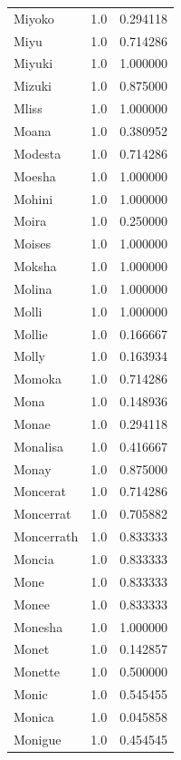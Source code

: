 \documentclass[
  letterpaper,
  DIV=11,
  numbers=noendperiod]{scrreprt}
\begin{document}
\begin{tabular}{lrr}
Miyoko          &   1.0 &   0.294118 \\
Miyu            &   1.0 &   0.714286 \\
Miyuki          &   1.0 &   1.000000 \\
Mizuki          &   1.0 &   0.875000 \\
Mliss           &   1.0 &   1.000000 \\
Moana           &   1.0 &   0.380952 \\
Modesta         &   1.0 &   0.714286 \\
Moesha          &   1.0 &   1.000000 \\
Mohini          &   1.0 &   1.000000 \\
Moira           &   1.0 &   0.250000 \\
Moises          &   1.0 &   1.000000 \\
Moksha          &   1.0 &   1.000000 \\
Molina          &   1.0 &   1.000000 \\
Molli           &   1.0 &   1.000000 \\
Mollie          &   1.0 &   0.166667 \\
Molly           &   1.0 &   0.163934 \\
Momoka          &   1.0 &   0.714286 \\
Mona            &   1.0 &   0.148936 \\
Monae           &   1.0 &   0.294118 \\
Monalisa        &   1.0 &   0.416667 \\
Monay           &   1.0 &   0.875000 \\
Moncerat        &   1.0 &   0.714286 \\
Moncerrat       &   1.0 &   0.705882 \\
Moncerrath      &   1.0 &   0.833333 \\
Moncia          &   1.0 &   0.833333 \\
Mone            &   1.0 &   0.833333 \\
Monee           &   1.0 &   0.833333 \\
Monesha         &   1.0 &   1.000000 \\
Monet           &   1.0 &   0.142857 \\
Monette         &   1.0 &   0.500000 \\
Monic           &   1.0 &   0.545455 \\
Monica          &   1.0 &   0.045858 \\
Monigue         &   1.0 &   0.454545 \\

\end{tabular}
\end{document}
